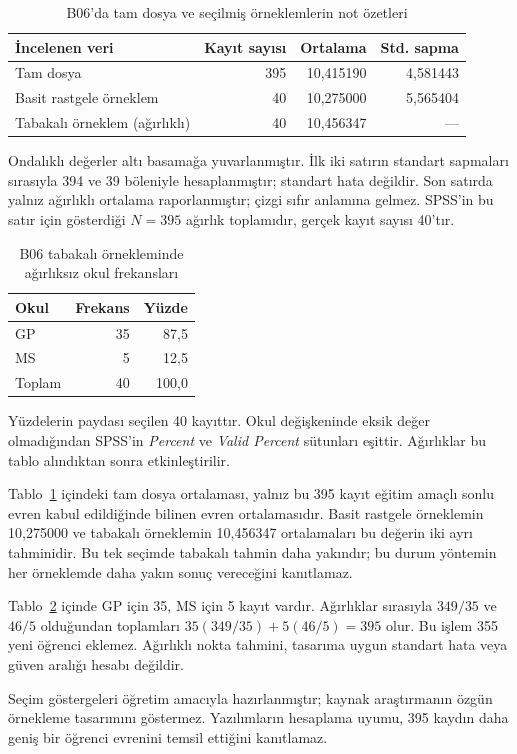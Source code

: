 \begin{table}[H]
\centering
\caption{B06'da tam dosya ve seçilmiş örneklemlerin not özetleri}
\label{tab:b06-dogrulanmis-betimsel}
\small
\begin{tabular}{@{}lrrr@{}}
\toprule
İncelenen veri & Kayıt sayısı & Ortalama & Std. sapma \\
\midrule
Tam dosya & 395 & 10,415190 & 4,581443 \\
Basit rastgele örneklem & 40 & 10,275000 & 5,565404 \\
Tabakalı örneklem (ağırlıklı) & 40 & 10,456347 & --- \\
\bottomrule
\end{tabular}
\par\smallskip
{\footnotesize Ondalıklı değerler altı basamağa yuvarlanmıştır.
İlk iki satırın standart sapmaları sırasıyla 394 ve 39 böleniyle
hesaplanmıştır; standart hata değildir. Son satırda yalnız ağırlıklı
ortalama raporlanmıştır; çizgi sıfır anlamına gelmez. SPSS'in bu
satır için gösterdiği $N=395$ ağırlık toplamıdır, gerçek kayıt sayısı
40'tır.\par}
\end{table}

\begin{table}[H]
\centering
\caption{B06 tabakalı örnekleminde ağırlıksız okul frekansları}
\label{tab:b06-dogrulanmis-tabaka}
\begin{tabular}{@{}lrr@{}}
\toprule
Okul & Frekans & Yüzde \\
\midrule
GP & 35 & 87,5 \\
MS & 5 & 12,5 \\
Toplam & 40 & 100,0 \\
\bottomrule
\end{tabular}
\par\smallskip
{\footnotesize Yüzdelerin paydası seçilen 40 kayıttır. Okul değişkeninde
eksik değer olmadığından SPSS'in \emph{Percent} ve \emph{Valid Percent}
sütunları eşittir. Ağırlıklar bu tablo alındıktan sonra etkinleştirilir.\par}
\end{table}

\begin{outputguidebox}
Tablo~\ref{tab:b06-dogrulanmis-betimsel} içindeki tam dosya ortalaması,
yalnız bu 395 kayıt eğitim amaçlı sonlu evren kabul edildiğinde bilinen
evren ortalamasıdır. Basit rastgele örneklemin 10,275000 ve tabakalı
örneklemin 10,456347 ortalamaları bu değerin iki ayrı tahminidir.
Bu tek seçimde tabakalı tahmin daha yakındır; bu durum yöntemin her
örneklemde daha yakın sonuç vereceğini kanıtlamaz.

Tablo~\ref{tab:b06-dogrulanmis-tabaka} içinde GP için 35, MS için 5
kayıt vardır. Ağırlıklar sırasıyla $349/35$ ve $46/5$ olduğundan
toplamları $35(349/35)+5(46/5)=395$ olur. Bu işlem 355 yeni öğrenci
eklemez. Ağırlıklı nokta tahmini, tasarıma uygun standart hata veya
güven aralığı hesabı değildir.

Seçim göstergeleri öğretim amacıyla hazırlanmıştır; kaynak araştırmanın
özgün örnekleme tasarımını göstermez. Yazılımların hesaplama uyumu,
395 kaydın daha geniş bir öğrenci evrenini temsil ettiğini kanıtlamaz.
\end{outputguidebox}


